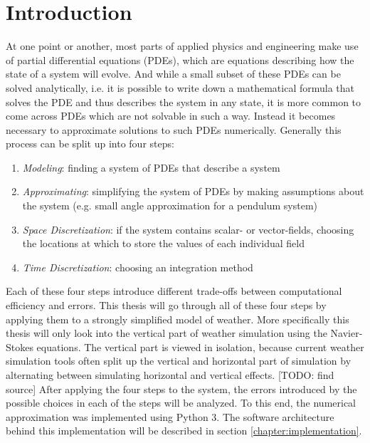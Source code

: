 
\chapter{Introduction}\label{chapter:introduction}

At one point or another, most parts of applied physics and engineering make use of partial differential equations (PDEs), which are equations describing how the state of a system will evolve.
And while a small subset of these PDEs can be solved analytically, i.e. it is possible to write down a mathematical formula that solves the PDE and thus describes the system in any state, it is more common to come across PDEs which are not solvable in such a way.
Instead it becomes necessary to approximate solutions to such PDEs numerically.
Generally this process can be split up into four steps:
\begin{enumerate}
\item \emph{Modeling}: finding a system of PDEs that describe a system
\item \emph{Approximating}: simplifying the system of PDEs by making assumptions about the system (e.g. small angle approximation for a pendulum system)
\item \emph{Space Discretization}: if the system contains scalar- or vector-fields, choosing the locations at which to store the values of each individual field
\item \emph{Time Discretization}: choosing an integration method
\end{enumerate}
Each of these four steps introduce different trade-offs between computational efficiency and errors.
This thesis will go through all of these four steps by applying them to a strongly simplified model of weather.
More specifically this thesis will only look into the vertical part of weather simulation using the Navier-Stokes equations.
The vertical part is viewed in isolation, because current weather simulation tools often split up the vertical and horizontal part of simulation by alternating between simulating horizontal and vertical effects. [TODO: find source]
After applying the four steps to the system, the errors introduced by the possible choices in each of the steps will be analyzed.
To this end, the numerical approximation was implemented using Python 3.
The software architecture behind this implementation will be described in section \ref{chapter:implementation}.